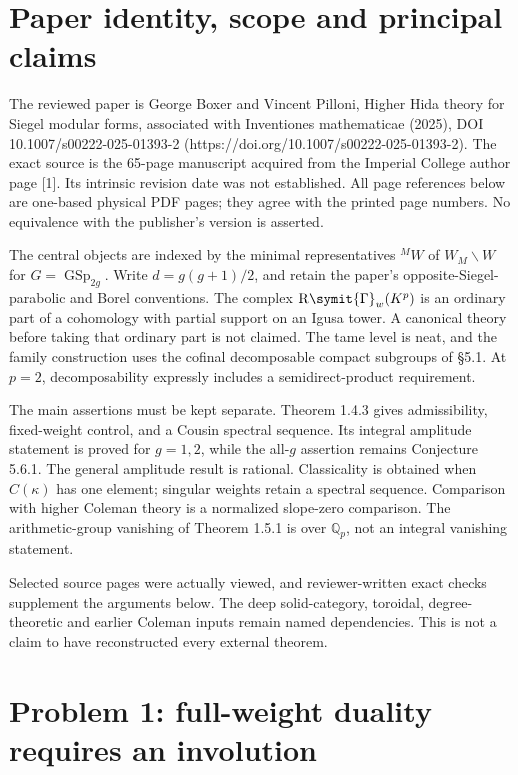 \documentclass[10pt]{article}
\begin{document}
\section*{Paper identity, scope and principal claims}
The reviewed paper is George Boxer and Vincent Pilloni, Higher Hida theory for Siegel modular forms, associated with Inventiones mathematicae (2025), DOI 10.1007/s00222-025-01393-2 (https://doi.org/10.1007/s00222-025-01393-2). The exact source is the 65-page manuscript acquired from the Imperial College author page [1]. Its intrinsic revision date was not established. All page references below are one-based physical PDF pages; they agree with the printed page numbers. No equivalence with the publisher’s version is asserted.\par
The central objects are indexed by the minimal representatives \({}^{M}W\) of \(W_M\backslash W\) for \(G=\operatorname{GSp}_{2g}\). Write \(d=g(g+1)/2\), and retain the paper’s opposite-Siegel-parabolic and Borel conventions. The complex \(\operatorname{R\symit{\Gamma}}_w(K^p)\) is an ordinary part of a cohomology with partial support on an Igusa tower. A canonical theory before taking that ordinary part is not claimed. The tame level is neat, and the family construction uses the cofinal decomposable compact subgroups of §5.1. At \(p=2\), decomposability expressly includes a semidirect-product requirement.\par
The main assertions must be kept separate. Theorem 1.4.3 gives admissibility, fixed-weight control, and a Cousin spectral sequence. Its integral amplitude statement is proved for \(g=1,2\), while the all-\(g\) assertion remains Conjecture 5.6.1. The general amplitude result is rational. Classicality is obtained when \(C(\kappa)\) has one element; singular weights retain a spectral sequence. Comparison with higher Coleman theory is a normalized slope-zero comparison. The arithmetic-group vanishing of Theorem 1.5.1 is over \(\mathbb Q_p\), not an integral vanishing statement.\par
Selected source pages were actually viewed, and reviewer-written exact checks supplement the arguments below. The deep solid-category, toroidal, degree-theoretic and earlier Coleman inputs remain named dependencies. This is not a claim to have reconstructed every external theorem.\par
\section*{Problem 1: full-weight duality requires an involution}
\end{document}
